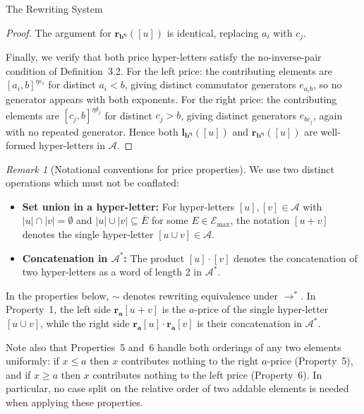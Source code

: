 \documentclass{article}
\theoremstyle{definition}
\theoremstyle{remark}
\newtheorem{remark}[theorem]{Remark}
\theoremstyle{theorem}
\theoremstyle{definition}
\begin{document}
\begin{section}{The Rewriting System}
\begin{proof}
The argument for $\mathbf{r_{b^{\eta}}}([u])$ is identical, replacing $a_i$ with $c_j$.

Finally, we verify that both price hyper-letters satisfy the no-inverse-pair
condition of Definition~3.2. For the left price: the contributing elements
are $[a_i, b]^{\eta\varepsilon_i}$ for distinct $a_i < b$, giving distinct
commutator generators $e_{a_i b}$, so no generator appears with both
exponents. For the right price: the contributing elements are
$[c_j, b]^{\eta\delta_j}$ for distinct $c_j > b$, giving distinct generators
$e_{bc_j}$, again with no repeated generator. 
Hence both $\mathbf{l_{b^\eta}}([u])$ and $\mathbf{r_{b^\eta}}([u])$ are
well-formed hyper-letters in $\mathcal{A}$.
\end{proof}

\begin{remark}[Notational conventions for price properties]
We use two distinct operations which must not be conflated:
\begin{itemize}
    \item \textbf{Set union in a hyper-letter:} For hyper-letters $[u],[v]\in\mathcal{A}$
    with $|u|\cap|v|=\emptyset$ and $|u|\cup|v|\subseteq\bar{E}$ for some
    $E\in\mathcal{E}_{\max}$, the notation $[u+v]$ denotes the single
    hyper-letter $[u\cup v]\in\mathcal{A}$.
    \item \textbf{Concatenation in $\mathcal{A}^*$:} The product $[u]\cdot[v]$
    denotes the concatenation of two hyper-letters as a word of length 2
    in $\mathcal{A}^*$.
\end{itemize}

In the properties below, $\sim$ denotes rewriting equivalence under $\to^*$.
In Property~1, the left side $\mathbf{r_a}[u+v]$ is the $a$-price of the
single hyper-letter $[u\cup v]$, while the right side
$\mathbf{r_a}[u]\cdot\mathbf{r_a}[v]$ is their concatenation in $\mathcal{A}^*$.

Note also that Properties~5 and~6 handle both orderings of any two elements
uniformly: if $x \leq a$ then $x$ contributes nothing to the right $a$-price
(Property~5), and if $x \geq a$ then $x$ contributes nothing to the left
price (Property~6). In particular, no case split on the relative order of
two addable elements is needed when applying these properties.
\end{remark}


\end{section}
\end{document}
